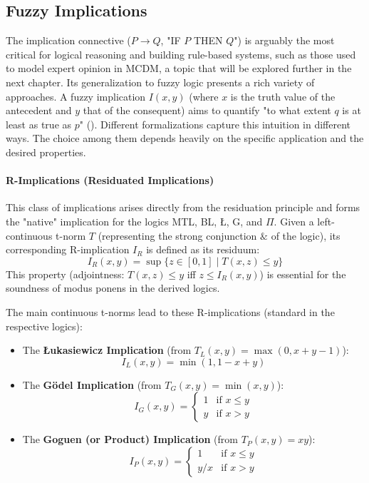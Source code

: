 \subsection{Fuzzy Implications}


The implication connective ($P \rightarrow Q$, "IF $P$ THEN $Q$") is arguably the most critical for logical reasoning and building rule-based systems, such as those used to model expert opinion in MCDM, a topic that will be explored further in the next chapter. Its generalization to fuzzy logic presents a rich variety of approaches. A fuzzy implication $I(x,y)$ (where $x$ is the truth value of the antecedent and $y$ that of the consequent) aims to quantify "to what extent $q$ is at least as true as $p$" (\cite[p.57]{FULLER2}). Different formalizations capture this intuition in different ways. The choice among them depends heavily on the specific application and the desired properties.

\paragraph{R-Implications (Residuated Implications)}
This class of implications arises directly from the residuation principle and forms the "native" implication for the logics MTL, BL, Ł, G, and $\Pi$. Given a left-continuous t-norm $T$ (representing the strong conjunction $\&$ of the logic), its corresponding R-implication $I_R$ is defined as its residuum:
\[
I_R(x, y) = \sup\{z \in [0,1] \mid T(x, z) \le y\}
\]
This property (adjointness: $T(x,z) \le y$ iff $z \le I_R(x, y)$) is essential for the soundness of modus ponens in the derived logics.

\begin{example}
The main continuous t-norms lead to these R-implications (standard in the respective logics):
\begin{itemize}
    \item The \textbf{Łukasiewicz Implication} (from $T_L(x,y) = \max(0, x+y-1)$):
    \[I_L(x,y) = \min(1, 1-x+y)\]
    \item The \textbf{Gödel Implication} (from $T_G(x,y) = \min(x,y)$):
    \[I_G(x,y) = \begin{cases} 1 & \text{if } x \le y \\ y & \text{if } x > y \end{cases}\]
    \item The \textbf{Goguen (or Product) Implication} (from $T_P(x,y) = xy$):
    \[I_P(x,y) = \begin{cases} 1 & \text{if } x \le y \\ y/x & \text{if } x > y \end{cases}\]
\end{itemize}
\end{example}


